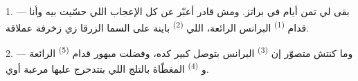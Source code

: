 %
%
%
%
%
%
%
%
%

\VUsaut{4.0mm}
\VUsaut{3.0mm}

\VUsaut{3.0mm}

\VUsaut{3.0mm}

1. --- بقى لي تمن أيام في براتز. ومش قادر أعبّر عن كل الإعجاب اللي حسّيت بيه
وأنا قدام  \textsuperscript{(1)} البرانس الرائعة، اللي
 \textsuperscript{(2)} باينة على السما الزرقا زي زخرفة عملاقة.

2. --- وما كنتش متصوّر إن  \textsuperscript{(3)} البرانس بتوصل
 كبير كده، وفضلت مبهور قدام 
\textsuperscript{(5)} الرائعة و \textsuperscript{(4)} المغطّاة بالتلج
اللي بتتدحرج عليها  مرعبة أوي.

